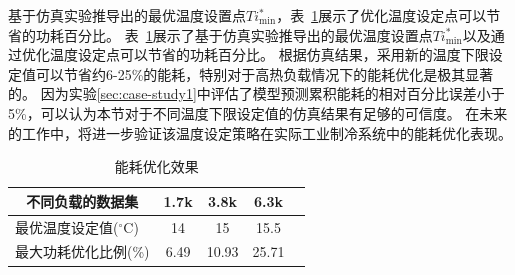 基于仿真实验推导出的最优温度设置点$Ti^*_{\min}$，表~\ref{tab:power_save_percent}展示了优化温度设定点可以节省的功耗百分比。
表~\ref{tab:power_save_percent}展示了基于仿真实验推导出的最优温度设置点$Ti^*_{\min}$以及通过优化温度设定点可以节省的功耗百分比。
根据仿真结果，采用新的温度下限设定值可以节省约6-25\%的能耗，特别对于高热负载情况下的能耗优化是极其显著的。
因为实验\ref{sec:case-study1}中评估了模型预测累积能耗的相对百分比误差小于5\%，可以认为本节对于不同温度下限设定值的仿真结果有足够的可信度。
在未来的工作中，将进一步验证该温度设定策略在实际工业制冷系统中的能耗优化表现。


\begin{table}[]
\centering
\caption{能耗优化效果}
\label{tab:power_save_percent}
\begin{tabular}{lcccc}
\hline
\multicolumn{1}{c}{\textbf{不同负载的数据集}} & 1.7k  & 3.8k    & 6.3k  \\ \hline
最优温度设定值(${ }^{\circ} \mathrm{C}$)               & 14   & 15     & 15.5    \\
最大功耗优化比例(\%)              & 6.49 & 10.93  & 25.71\\ \hline
\end{tabular}
\end{table}







